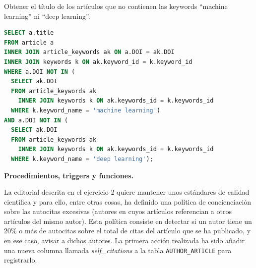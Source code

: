 \documentclass[12pt,a4paper,addpoints,answers]{exam}
\begin{document}
\begin{questions}
\begin{parts}
\begin{subparts}
\subpart[\half] Obtener el título de los artículos que no contienen las keywords ``machine learning'' ni ``deep learning''.

\begin{solution}[16em]
\begin{lstlisting}[language=SQL]
SELECT a.title 
FROM article a
INNER JOIN article_keywords ak ON a.DOI = ak.DOI
INNER JOIN keywords k ON ak.keyword_id = k.keyword_id
WHERE a.DOI NOT IN (
  SELECT ak.DOI
  FROM article_keywords ak
    INNER JOIN keywords k ON ak.keywords_id = k.keywords_id
  WHERE k.keyword_name = 'machine learning')
AND a.DOI NOT IN (    
  SELECT ak.DOI
  FROM article_keywords ak
    INNER JOIN keywords k ON ak.keywords_id = k.keywords_id
  WHERE k.keyword_name = 'deep learning');
\end{lstlisting}
\end{solution}

\end{subparts}
\end{parts}

\newpage
\question[2\half] \textbf{Procedimientos, triggers y funciones.}

La editorial descrita en el ejercicio 2 quiere mantener unos estándares de calidad científica y para ello, entre otras cosas, ha definido una política de concienciación sobre las autocitas excesivas (autores en cuyos artículos referencian a otros artículos del mismo autor). Esta política consiste en detectar si un autor tiene un 20\% o más de autocitas sobre el total de citas del artículo que se ha publicado, y en ese caso, avisar a dichos autores. La primera acción realizada ha sido añadir una nueva columna llamada \textit{self\_citations} a la tabla \texttt{AUTHOR\_ARTICLE} para registrarlo.


\end{questions}
\end{document}
